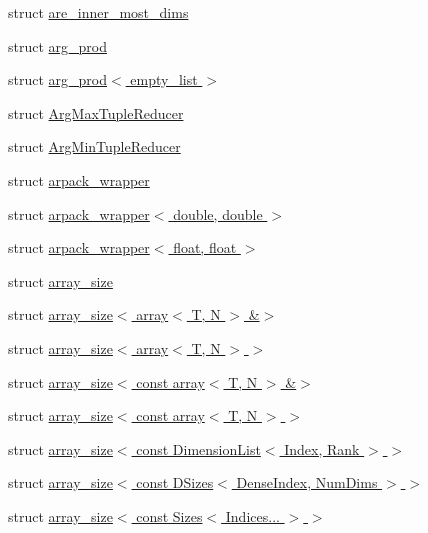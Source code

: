\begin{DoxyCompactItemize}
struct \hyperlink{struct_eigen_1_1internal_1_1are__inner__most__dims}{are\+\_\+inner\+\_\+most\+\_\+dims}
\item 
struct \hyperlink{struct_eigen_1_1internal_1_1arg__prod}{arg\+\_\+prod}
\item 
struct \hyperlink{struct_eigen_1_1internal_1_1arg__prod_3_01empty__list_01_4}{arg\+\_\+prod$<$ empty\+\_\+list $>$}
\item 
struct \hyperlink{struct_eigen_1_1internal_1_1_arg_max_tuple_reducer}{Arg\+Max\+Tuple\+Reducer}
\item 
struct \hyperlink{struct_eigen_1_1internal_1_1_arg_min_tuple_reducer}{Arg\+Min\+Tuple\+Reducer}
\item 
struct \hyperlink{struct_eigen_1_1internal_1_1arpack__wrapper}{arpack\+\_\+wrapper}
\item 
struct \hyperlink{struct_eigen_1_1internal_1_1arpack__wrapper_3_01double_00_01double_01_4}{arpack\+\_\+wrapper$<$ double, double $>$}
\item 
struct \hyperlink{struct_eigen_1_1internal_1_1arpack__wrapper_3_01float_00_01float_01_4}{arpack\+\_\+wrapper$<$ float, float $>$}
\item 
struct \hyperlink{struct_eigen_1_1internal_1_1array__size}{array\+\_\+size}
\item 
struct \hyperlink{struct_eigen_1_1internal_1_1array__size_3_01array_3_01_t_00_01_n_01_4_01_6_4}{array\+\_\+size$<$ array$<$ T, N $>$ \&$>$}
\item 
struct \hyperlink{struct_eigen_1_1internal_1_1array__size_3_01array_3_01_t_00_01_n_01_4_01_4}{array\+\_\+size$<$ array$<$ T, N $>$ $>$}
\item 
struct \hyperlink{struct_eigen_1_1internal_1_1array__size_3_01const_01array_3_01_t_00_01_n_01_4_01_6_4}{array\+\_\+size$<$ const array$<$ T, N $>$ \&$>$}
\item 
struct \hyperlink{struct_eigen_1_1internal_1_1array__size_3_01const_01array_3_01_t_00_01_n_01_4_01_4}{array\+\_\+size$<$ const array$<$ T, N $>$ $>$}
\item 
struct \hyperlink{struct_eigen_1_1internal_1_1array__size_3_01const_01_dimension_list_3_01_index_00_01_rank_01_4_01_4}{array\+\_\+size$<$ const Dimension\+List$<$ Index, Rank $>$ $>$}
\item 
struct \hyperlink{struct_eigen_1_1internal_1_1array__size_3_01const_01_d_sizes_3_01_dense_index_00_01_num_dims_01_4_01_4}{array\+\_\+size$<$ const D\+Sizes$<$ Dense\+Index, Num\+Dims $>$ $>$}
\item 
struct \hyperlink{struct_eigen_1_1internal_1_1array__size_3_01const_01_sizes_3_01_indices_8_8_8_01_4_01_4}{array\+\_\+size$<$ const Sizes$<$ Indices... $>$ $>$}

\end{DoxyCompactItemize}
